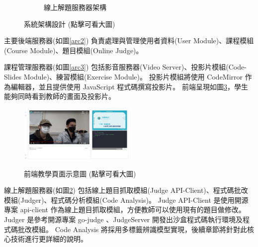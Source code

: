 \documentclass[12pt]{article}
\begin{document}
\begin{enumerate}
\begin{enumerate}
\begin{enumerate}[label=(\arabic*)]
\begin{figure}[htb]
\begin{subfigure}{0.45\linewidth}
{              }
              \caption{線上解題服務器架構}
              \label{arc4}            
            \end{subfigure}
            \caption{系統架構設計 (點擊可看大圖)}
          \end{figure}
      
          \par 主要後端服務器(如圖\ref{arc2})
            負責處理與管理使用者資料(User Module)、課程模組(Course Module)、題目模組(Online Judge)。
          
          \par 課程管理服務器(如圖\ref{arc3})
            包括影音服務器(Video Server)、投影片模組(Code-Slides Module)、練習模組(Exercise Module)。
            投影片模組將使用 CodeMirror 作為編輯器，並且提供使用 JavaScript 程式碼撰寫投影片。
            前端呈現如圖\ref{arc5}，學生能夠同時看到教師的畫面及投影片。
          \begin{figure}[H]
            \centering
            \href{https://raw.githubusercontent.com/programingtw/proglearn-plan/main/img/testboard.png}{ 
              \includegraphics[width=0.5\textwidth]{./img/testboard.png}
            }
            \caption{前端教學頁面示意圖 (點擊可看大圖)}
            \label{arc5}
          \end{figure}
          \par 線上解題服務器(如圖\ref{arc4})
            包括線上題目抓取模組(Judge API-Client)、程式碼批改模組(Judger)、程式碼分析模組(Code Analysis)。
             Judge API-Client 是使用開源專案 api-client \cite{apiclient} 作為線上題目抓取模組，方便教師可以使用現有的題目做修改。
             Judger 是參考開源專案 go-judge \cite{judger1} 、JudgeServer \cite{judger2} 開發出沙盒程式碼執行環境及程式碼批改模組。
             Code Analysis 將採用多標籤辨識模型實現，後續章節將針對此核心技術進行更詳細的說明。
        

\end{enumerate}
\end{enumerate}
\end{enumerate}
\end{document}
